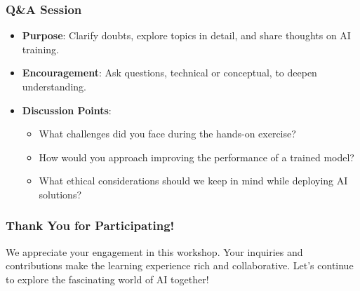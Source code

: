 \documentclass{beamer}
\begin{document}
\begin{frame}[fragile]
    \frametitle{Q\&A Session}
    \begin{itemize}
        \item \textbf{Purpose}: Clarify doubts, explore topics in detail, and share thoughts on AI training.
        \item \textbf{Encouragement}: Ask questions, technical or conceptual, to deepen understanding.
        \item \textbf{Discussion Points}:
        \begin{itemize}
            \item What challenges did you face during the hands-on exercise?
            \item How would you approach improving the performance of a trained model?
            \item What ethical considerations should we keep in mind while deploying AI solutions?
        \end{itemize}
    \end{itemize}
\end{frame}

\begin{frame}[fragile]
    \frametitle{Thank You for Participating!}
    We appreciate your engagement in this workshop. Your inquiries and contributions make the learning experience rich and collaborative. Let's continue to explore the fascinating world of AI together!
\end{frame}
\end{document}
